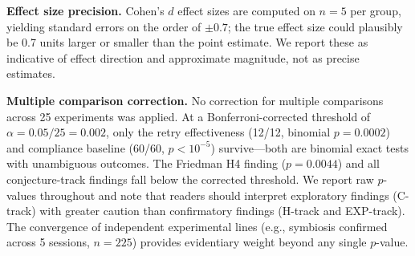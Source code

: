 \documentclass[11pt,a4paper]{article}
\begin{document}
\textbf{Effect size precision.} Cohen's $d$ effect sizes are computed on $n=5$ per group, yielding standard errors on the order of $\pm0.7$; the true effect size could plausibly be 0.7 units larger or smaller than the point estimate. We report these as indicative of effect direction and approximate magnitude, not as precise estimates.

\textbf{Multiple comparison correction.} No correction for multiple comparisons across 25 experiments was applied. At a Bonferroni-corrected threshold of $\alpha=0.05/25=0.002$, only the retry effectiveness (12/12, binomial $p=0.0002$) and compliance baseline (60/60, $p<10^{-5}$) survive---both are binomial exact tests with unambiguous outcomes. The Friedman H4 finding ($p=0.0044$) and all conjecture-track findings fall below the corrected threshold. We report raw $p$-values throughout and note that readers should interpret exploratory findings (C-track) with greater caution than confirmatory findings (H-track and EXP-track). The convergence of independent experimental lines (e.g., symbiosis confirmed across 5 sessions, $n=225$) provides evidentiary weight beyond any single $p$-value.
\end{document}
